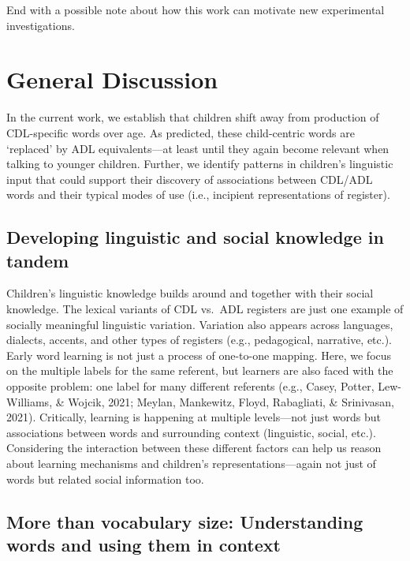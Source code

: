 \documentclass[10pt, letterpaper]{article}
\begin{document}
End with a possible note about how this work can motivate new
experimental investigations.

\hypertarget{general-discussion}{%
\section{General Discussion}\label{general-discussion}}

In the current work, we establish that children shift away from
production of CDL-specific words over age. As predicted, these
child-centric words are `replaced' by ADL equivalents---at least until
they again become relevant when talking to younger children. Further, we
identify patterns in children's linguistic input that could support
their discovery of associations between CDL/ADL words and their typical
modes of use (i.e., incipient representations of register).

\hypertarget{developing-linguistic-and-social-knowledge-in-tandem}{%
\subsection{Developing linguistic and social knowledge in
tandem}\label{developing-linguistic-and-social-knowledge-in-tandem}}

Children's linguistic knowledge builds around and together with their
social knowledge. The lexical variants of CDL vs.~ADL registers are just
one example of socially meaningful linguistic variation. Variation also
appears across languages, dialects, accents, and other types of
registers (e.g., pedagogical, narrative, etc.). Early word learning is
not just a process of one-to-one mapping. Here, we focus on the multiple
labels for the same referent, but learners are also faced with the
opposite problem: one label for many different referents (e.g., Casey,
Potter, Lew-Williams, \& Wojcik, 2021; Meylan, Mankewitz, Floyd,
Rabagliati, \& Srinivasan, 2021). Critically, learning is happening at
multiple levels---not just words but associations between words and
surrounding context (linguistic, social, etc.). Considering the
interaction between these different factors can help us reason about
learning mechanisms and children's representations---again not just of
words but related social information too.

\hypertarget{more-than-vocabulary-size-understanding-words-and-using-them-in-context}{%
\subsection{More than vocabulary size: Understanding words and using
them in
context}\label{more-than-vocabulary-size-understanding-words-and-using-them-in-context}}
\end{document}
